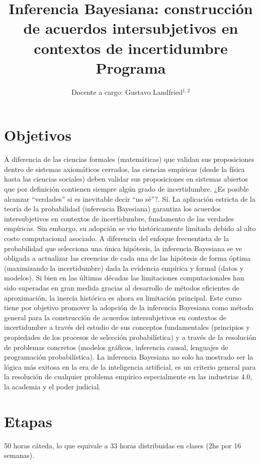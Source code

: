 \documentclass[10pt]{article}
\title{\huge Inferencia Bayesiana: construcción de acuerdos intersubjetivos en contextos de incertidumbre  \\[0.4cm]  \LARGE Programa}
\author{Docente a cargo: Gustavo Landfried$^{1,2}$}
\affil{\small 1. Bayes de las Provincias Unidas del Sur }
\affil{\vspace{-0.2cm}\small 2. Laboratorio Pacha Pampas}
\affil[]{Correspondencia: \texttt{glandfried@dc.uba.ar}, \texttt{bayesdelsur@gmail.com}}
\begin{document}
\maketitle

\section{Objetivos}

A diferencia de las ciencias formales (matemáticas) que validan sus proposiciones dentro de sistemas axiomáticos cerrados, las ciencias empíricas (desde la física hasta las ciencias sociales) deben validar sus proposiciones en sistemas abiertos que por definición contienen siempre algún grado de incertidumbre. ¿Es posible alcanzar ``verdades'' si es inevitable decir ``no sé''?. Sí. La aplicación estricta de la teoría de la probabilidad (inferencia Bayesiana) garantiza los acuerdos intersubjetivos en contextos de incertidumbre, fundamento de las verdades empíricas. Sin embargo, su adopción se vio históricamente limitada debido al alto costo computacional asociado. A diferencia del enfoque frecuentista de la probabilidad que selecciona una única hipótesis, la inferencia Bayesiana se ve obligada a actualizar las creencias de cada una de las hipótesis de forma óptima (maximizando la incertidumbre) dada la evidencia empírica y formal (datos y modelos). Si bien en las últimas décadas las limitaciones computacionales han sido superadas en gran medida gracias al desarrollo de métodos eficientes de aproximación, la inercia histórica es ahora su limitación principal. Este curso tiene por objetivo promover la adopción de la inferencia Bayesiana como método general para la construcción de acuerdos intersubjetivos en contextos de incertidumbre a través del estudio de sus conceptos fundamentales (principios y propiedades de los procesos de selección probabilística) y a través de la resolución de problemas concretos (modelos gráficos, inferencia causal, lenguajes de programación probabilística). La inferencia Bayesiana no solo ha mostrado ser la lógica más exitosa en la era de la inteligencia artificial, es un criterio general para la resolución de cualquier problema empírico especialmente en las industrias 4.0, la academia y el poder judicial.

\section{Etapas}

50 horas cáteda, lo que equivale a 33 horas distribuidas en clases (2hs por 16 semanas).
\end{document}
